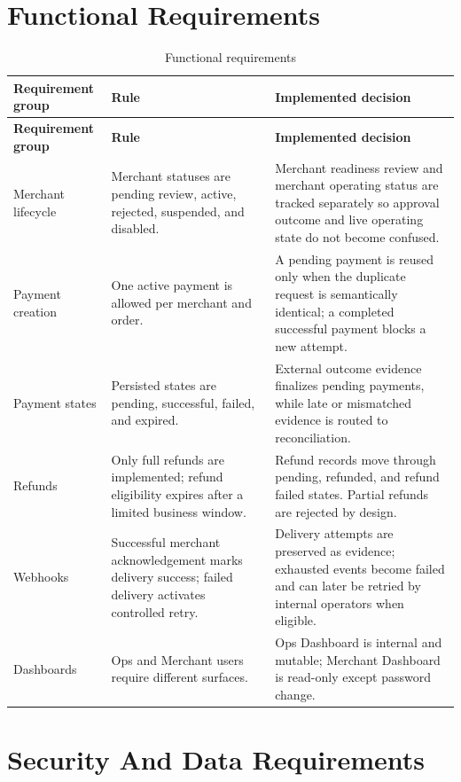 \section{Functional Requirements}

\begin{longtable}{L{0.24\textwidth}L{0.30\textwidth}L{0.36\textwidth}}
\caption{Functional requirements}\\
\toprule
\textbf{Requirement group} & \textbf{Rule} & \textbf{Implemented decision} \\
\midrule
\endfirsthead
\toprule
\textbf{Requirement group} & \textbf{Rule} & \textbf{Implemented decision} \\
\midrule
\endhead
Merchant lifecycle & Merchant statuses are pending review, active, rejected, suspended, and disabled. & Merchant readiness review and merchant operating status are tracked separately so approval outcome and live operating state do not become confused. \\
\bodyrowrule
Payment creation & One active payment is allowed per merchant and order. & A pending payment is reused only when the duplicate request is semantically identical; a completed successful payment blocks a new attempt. \\
\bodyrowrule
Payment states & Persisted states are pending, successful, failed, and expired. & External outcome evidence finalizes pending payments, while late or mismatched evidence is routed to reconciliation. \\
\bodyrowrule
Refunds & Only full refunds are implemented; refund eligibility expires after a limited business window. & Refund records move through pending, refunded, and refund failed states. Partial refunds are rejected by design. \\
\bodyrowrule
Webhooks & Successful merchant acknowledgement marks delivery success; failed delivery activates controlled retry. & Delivery attempts are preserved as evidence; exhausted events become failed and can later be retried by internal operators when eligible. \\
\bodyrowrule
Dashboards & Ops and Merchant users require different surfaces. & Ops Dashboard is internal and mutable; Merchant Dashboard is read-only except password change. \\
\bottomrule
\end{longtable}

\section{Security And Data Requirements}

